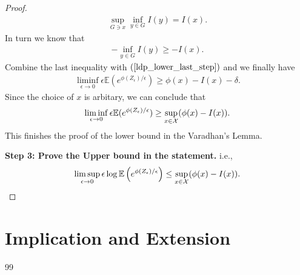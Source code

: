 \documentclass[10pt]{article}
\def\X{{\cal X}}
\newcommand{\e}{\mathbb{E}}
\newenvironment{Proof of lemma}{\noindent{\bf Proof of Lemma}}{\hfill$\Box$\newline}
\newenvironment{Proof of claim}{\noindent{\bf Proof of claim}}{\hfill$\Box$\newline}
\newenvironment{Proof of theorem}{\noindent{\bf Proof of Theorem}}{\hfill\scriptsize{$\Box$}\newline}
\newenvironment{Proof of theorems}{\noindent{\bf Proof of Theorems}}{\hfill$\Box$\newline}
\newenvironment{Proof of proposition}{\noindent{\bf Proof of Proposition}}{\hfill$\Box$\newline}
\newenvironment{Proof of propositions}{\noindent{\bf Proof of Propositions}}{\hfill$\Box$\newline}
\newenvironment{Proof of exercise}{\noindent{\it Proof of Exercise:}}{\hfill$\Box$}
\numberwithin{equation}{section}
\begin{document}
\begin{proof}
\begin{align}
        \sup_{G \ni x}\inf_{y \in G} I(y) = I(x).
    \end{align} 
    In turn we know that
    \begin{align}
        - \inf_{y \in G} I(y) \geq -I(x).
    \end{align}
    Combine the last inequality with $(\ref{ldp_lower_last_step})$ and we finally have
    \begin{align}
        \liminf_{\epsilon \to 0} \epsilon \e(e^{\phi(Z_{\epsilon})/\epsilon}) \geq \phi(x) - I(x) -\delta.
    \end{align}
    Since the choice of $x$ is arbitary, we can conclude that
    \begin{align}
        \liminf_{\epsilon \to 0} \epsilon \e(e^{\phi(Z_{\epsilon})/\epsilon}) \geq \sup_{x \in \X}(\phi(x) - I(x)).
    \end{align}
    This finishes the proof of the lower bound in the Varadhan's Lemma.

    \textbf{Step 3: Prove the Upper bound in the statement.} i.e.,
    \begin{align}
            \limsup_{\epsilon \to 0} \epsilon \log \e \left(e^{\phi(Z_{\epsilon})/\epsilon}\right) \leq \sup_{x \in \X}(\phi(x)-I(x)).
    \end{align}
\end{proof}

\section{Implication and Extension}
\begin{thebibliography}{99}

\end{thebibliography}
\end{document}
